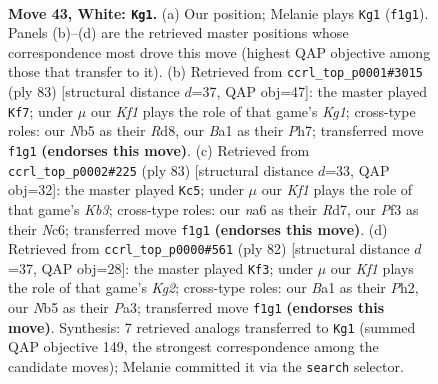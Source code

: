 \documentclass[11pt]{article}
\begin{document}
\clearpage

\begin{figure}[p]\centering
\begin{subfigure}{0.46\textwidth}\centering
\resizebox{\linewidth}{!}{%
\newchessgame
\chessboard[
  setfen={8/1p2pk1p/n5p1/pNp5/5r1P/2P2P2/P2R4/B4K2 w - - 1 43},
  showmover=false,
  pgfstyle=straightmove, color=movearrow, markmove={f1-g1}
]}
\caption{}
\end{subfigure}\hfill
\begin{subfigure}{0.46\textwidth}\centering
\resizebox{\linewidth}{!}{%
\newchessgame
\chessboard[
  setfen={3r2k1/7p/p7/5p2/PP2nB2/1P5P/3p2PK/3R4 b - - 1 42},
  showmover=false,
  pgfstyle=straightmove, color=movearrow, markmove={g8-f7}
]}
\caption{}
\end{subfigure}
\\[4pt]
\begin{subfigure}{0.46\textwidth}\centering
\resizebox{\linewidth}{!}{%
\newchessgame
\chessboard[
  setfen={8/3r2p1/1kn1R2p/p6P/6P1/5Pb1/1PP5/1K5R b - - 0 42},
  showmover=false,
  pgfstyle=straightmove, color=movearrow, markmove={b6-c5}
]}
\caption{}
\end{subfigure}\hfill
\begin{subfigure}{0.46\textwidth}\centering
\resizebox{\linewidth}{!}{%
\newchessgame
\chessboard[
  setfen={3r4/p5pk/3PBn1p/2p1p3/4P3/P7/6KP/3R4 w - - 4 42},
  showmover=false,
  pgfstyle=straightmove, color=movearrow, markmove={g2-f3}
]}
\caption{}
\end{subfigure}
\caption{\textbf{Move 43, White: \texttt{Kg1}.} (a) Our position; Melanie plays \texttt{Kg1} (\texttt{f1g1}). Panels (b)--(d) are the retrieved master positions whose correspondence most drove this move (highest QAP objective among those that transfer to it). (b) Retrieved from \texttt{ccrl\_top\_p0001\#3015} (ply 83) [structural distance $d$=37, QAP obj=47]: the master played \texttt{Kf7}; under $\mu$ our \emph{Kf1} plays the role of that game's \emph{Kg1}; cross-type roles: our \emph{N}b5 as their \emph{R}d8, our \emph{B}a1 as their \emph{P}h7; transferred move \texttt{f1g1} \textbf{(endorses this move)}. (c) Retrieved from \texttt{ccrl\_top\_p0002\#225} (ply 83) [structural distance $d$=33, QAP obj=32]: the master played \texttt{Kc5}; under $\mu$ our \emph{Kf1} plays the role of that game's \emph{Kb3}; cross-type roles: our \emph{n}a6 as their \emph{R}d7, our \emph{P}f3 as their \emph{N}c6; transferred move \texttt{f1g1} \textbf{(endorses this move)}. (d) Retrieved from \texttt{ccrl\_top\_p0000\#561} (ply 82) [structural distance $d$=37, QAP obj=28]: the master played \texttt{Kf3}; under $\mu$ our \emph{Kf1} plays the role of that game's \emph{Kg2}; cross-type roles: our \emph{B}a1 as their \emph{P}h2, our \emph{N}b5 as their \emph{P}a3; transferred move \texttt{f1g1} \textbf{(endorses this move)}. Synthesis: 7 retrieved analogs transferred to \texttt{Kg1} (summed QAP objective 149, the strongest correspondence among the candidate moves); Melanie committed it via the \texttt{search} selector.}
\label{fig:thought-m84}
\end{figure}
\end{document}
